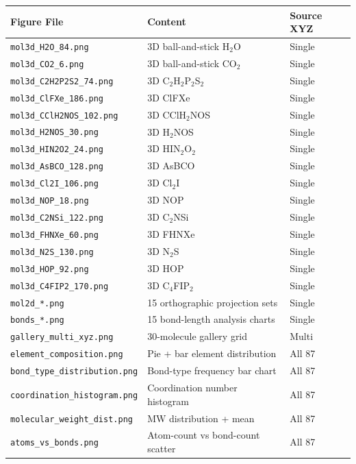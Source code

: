 \documentclass[11pt,a4paper]{article}
\begin{document}
\begin{center}
\small
\begin{tabular}{lp{6cm}l}
\toprule
\textbf{Figure File} & \textbf{Content} & \textbf{Source XYZ} \\
\midrule
\texttt{mol3d\_H2O\_84.png}        & 3D ball-and-stick H$_2$O         & Single \\
\texttt{mol3d\_CO2\_6.png}         & 3D ball-and-stick CO$_2$         & Single \\
\texttt{mol3d\_C2H2P2S2\_74.png}   & 3D C$_2$H$_2$P$_2$S$_2$        & Single \\
\texttt{mol3d\_ClFXe\_186.png}     & 3D ClFXe                        & Single \\
\texttt{mol3d\_CClH2NOS\_102.png}  & 3D CClH$_2$NOS                  & Single \\
\texttt{mol3d\_H2NOS\_30.png}      & 3D H$_2$NOS                     & Single \\
\texttt{mol3d\_HIN2O2\_24.png}     & 3D HIN$_2$O$_2$                 & Single \\
\texttt{mol3d\_AsBCO\_128.png}     & 3D AsBCO                        & Single \\
\texttt{mol3d\_Cl2I\_106.png}      & 3D Cl$_2$I                      & Single \\
\texttt{mol3d\_NOP\_18.png}        & 3D NOP                          & Single \\
\texttt{mol3d\_C2NSi\_122.png}     & 3D C$_2$NSi                     & Single \\
\texttt{mol3d\_FHNXe\_60.png}      & 3D FHNXe                        & Single \\
\texttt{mol3d\_N2S\_130.png}       & 3D N$_2$S                       & Single \\
\texttt{mol3d\_HOP\_92.png}        & 3D HOP                          & Single \\
\texttt{mol3d\_C4FIP2\_170.png}    & 3D C$_4$FIP$_2$                 & Single \\
\texttt{mol2d\_*.png}              & 15 orthographic projection sets  & Single \\
\texttt{bonds\_*.png}              & 15 bond-length analysis charts   & Single \\
\texttt{gallery\_multi\_xyz.png}   & 30-molecule gallery grid         & Multi \\
\texttt{element\_composition.png}  & Pie + bar element distribution   & All 87 \\
\texttt{bond\_type\_distribution.png} & Bond-type frequency bar chart & All 87 \\
\texttt{coordination\_histogram.png}  & Coordination number histogram & All 87 \\
\texttt{molecular\_weight\_dist.png}  & MW distribution + mean        & All 87 \\
\texttt{atoms\_vs\_bonds.png}         & Atom-count vs bond-count scatter & All 87 \\
\bottomrule
\end{tabular}
\end{center}
\end{document}
